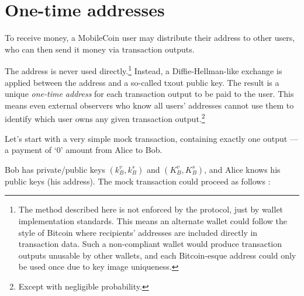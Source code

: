 \section{One-time addresses}
\label{sec:one-time-addresses}

To receive money, a MobileCoin user may distribute their address to other users, who can then send it money via transaction outputs.

The address is never used directly.\footnote{\label{footnote:address-wallet-standards}The method described here is not enforced by the protocol, just by wallet implementation standards. This means an alternate wallet could follow the style of Bitcoin where recipients' addresses are included directly in transaction data. Such a non-compliant wallet would produce transaction outputs unusable by other wallets, and each Bitcoin-esque address could only be used once due to key image uniqueness.} Instead, a Diffie-Hellman-like exchange is applied between the address and a so-called txout public key. The result is a unique {\em one-time address} for each transaction output to be paid to the user. This means even external observers who know all users’ addresses cannot use them to identify which user owns any given transaction output.\footnote{Except with negligible probability.}


Let’s start with a very simple mock transaction, containing exactly one output --- a payment of `0' amount from Alice to Bob.

Bob has private/public keys $(k_B^v, k_B^s)$ and $(K_B^v, K_B^s)$, and Alice knows his public keys (his address). The mock transaction could proceed as follows \cite{cryptoNoteWhitePaper}:


